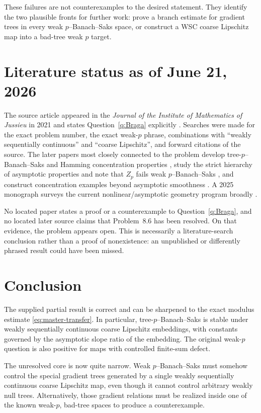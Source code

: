 \documentclass[11pt]{amsart}
\theoremstyle{definition}
\theoremstyle{remark}
\begin{document}
These failures are not counterexamples to the desired statement.  They identify the two plausible fronts for further work: prove a branch estimate for gradient trees in every weak $p$--Banach--Saks space, or construct a WSC coarse Lipschitz map into a bad-tree weak $p$ target.

\section{Literature status as of June 21, 2026}

The source article appeared in the \emph{Journal of the Institute of Mathematics of Jussieu} in 2021 and states Question~\ref{q:Braga} explicitly \cite{BragaJIMJ}.  Searches were made for the exact problem number, the exact weak-$p$ phrase, combinations with ``weakly sequentially continuous'' and ``coarse Lipschitz'', and forward citations of the source.  The later papers most closely connected to the problem develop tree-$p$--Banach--Saks and Hamming concentration properties \cite{FovelleHamming}, study the strict hierarchy of asymptotic properties and note that $Z_p$ fails weak $p$--Banach--Saks \cite{CauseyFovelleLancien}, and construct concentration examples beyond asymptotic smoothness \cite{FovelleSmoothness}.  A 2025 monograph surveys the current nonlinear/asymptotic geometry program broadly \cite{BaudierLancienBook}.

No located paper states a proof or a counterexample to Question~\ref{q:Braga}, and no located later source claims that Problem~8.6 has been resolved.  On that evidence, the problem appears open.  This is necessarily a literature-search conclusion rather than a proof of nonexistence: an unpublished or differently phrased result could have been missed.

\section{Conclusion}

The supplied partial result is correct and can be sharpened to the exact modulus estimate \eqref{eq:master-transfer}.  In particular, tree-$p$--Banach--Saks is stable under weakly sequentially continuous coarse Lipschitz embeddings, with constants governed by the asymptotic slope ratio of the embedding.  The original weak-$p$ question is also positive for maps with controlled finite-sum defect.

The unresolved core is now quite narrow.  Weak $p$--Banach--Saks must somehow control the special gradient trees generated by a single weakly sequentially continuous coarse Lipschitz map, even though it cannot control arbitrary weakly null trees.  Alternatively, those gradient relations must be realized inside one of the known weak-$p$, bad-tree spaces to produce a counterexample.
\end{document}
